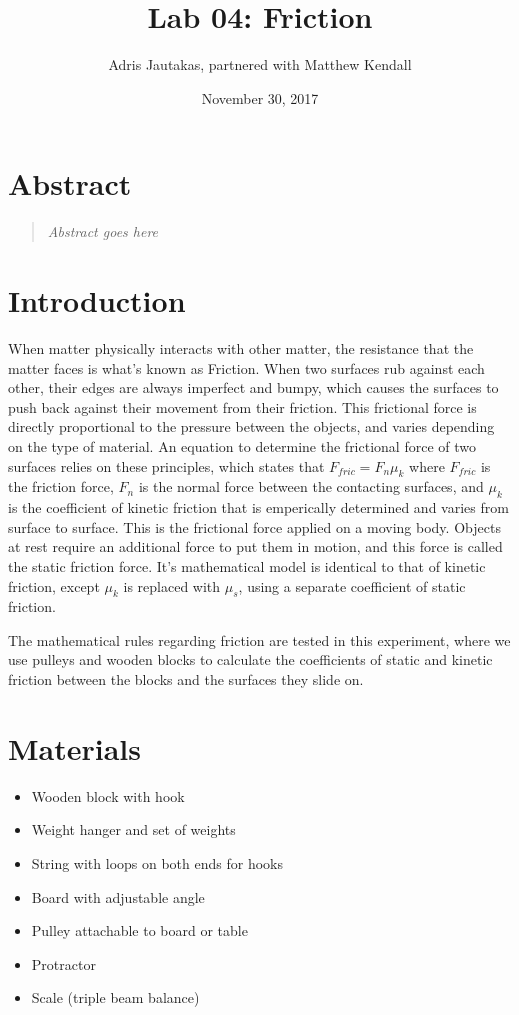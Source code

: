 \documentclass[12pt]{article}
\title{Lab 04: Friction}
\author{Adris Jautakas, partnered with Matthew Kendall}
\date{November 30, 2017}
\begin{document}
    \maketitle

    \section*{Abstract}
        \begin{quote}
        {\textit {\small 
            Abstract goes here
        } }
        \end{quote}

    \section{Introduction}
        \par When matter physically interacts with other matter, the resistance
        that the matter faces is what's known as Friction. When two surfaces rub 
        against each other, their edges are always imperfect and bumpy, which 
        causes the surfaces to push back against their movement from their 
        friction. This frictional force is directly proportional to the pressure
        between the objects, and varies depending on the type of material. An
        equation to determine the frictional force of two surfaces relies on
        these principles, which states that $F_{fric} = F_n\mu_k$ where 
        $F_{fric}$ is the friction force, $F_n$ is the normal force between the
        contacting surfaces, and $\mu_k$ is the coefficient of kinetic friction
        that is emperically determined and varies from surface to surface. This
        is the frictional force applied on a moving body. Objects at rest require
        an additional force to put them in motion, and this force is called the
        static friction force. It's mathematical model is identical to that of
        kinetic friction, except $\mu_k$ is replaced with $\mu_s$, using a 
        separate coefficient of static friction.
        \par The mathematical rules regarding friction are tested in this
        experiment, where we use pulleys and wooden blocks to calculate the
        coefficients of static and kinetic friction between the blocks and the
        surfaces they slide on.
    \section{Materials}
        \begin{itemize}
            \item Wooden block with hook
            \item Weight hanger and set of weights
            \item String with loops on both ends for hooks
            \item Board with adjustable angle
            \item Pulley attachable to board or table
            \item Protractor
            \item Scale (triple beam balance)
        \end{itemize}
\end{document}
